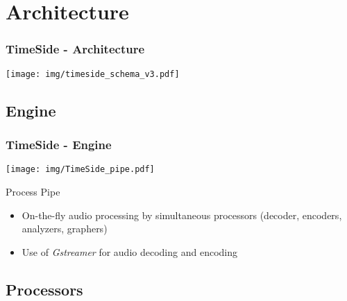 \documentclass[10pt, final, hyperref, table]{beamer}
\begin{document}
\section{Architecture}

\begin{frame}
  \frametitle{TimeSide - Architecture}
  \begin{center}
    \texttt{[image: img/timeside\_schema\_v3.pdf]}
  \end{center}
\end{frame}

\subsection{Engine}

\begin{frame}
  \frametitle{TimeSide - Engine}
  \begin{center}
    \texttt{[image: img/TimeSide\_pipe.pdf]}
  \end{center}
  \begin{block}{Process Pipe}
    \begin{itemize}
    \item On-the-fly audio processing by simultaneous processors (decoder, encoders, analyzers, graphers)
    \item Use of \emph{Gstreamer} for audio decoding and encoding    \end{itemize}
  \end{block}
\end{frame}


\subsection{Processors}

\end{document}
